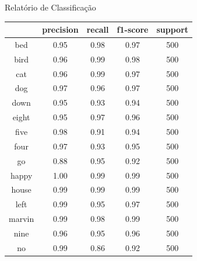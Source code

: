 \documentclass[10pt, compress]{beamer}
\begin{document}
\begin{frame}{Relatório de Classificação}
\begin{table}[htbp]
\centering
\begin{tabular}{|c|c|c|c|c|}
\hline
             & precision  &  recall & f1-score &  support \\ \hline

         bed &      0.95  &    0.98  &    0.97 &      500 \\ \hline
        bird &      0.96  &    0.99  &    0.98 &      500 \\ \hline
         cat &      0.96  &    0.99  &    0.97 &      500 \\ \hline
         dog &      0.97  &    0.96  &    0.97 &      500 \\ \hline
        down &      0.95  &    0.93  &    0.94 &      500 \\ \hline
       eight &      0.95  &    0.97  &    0.96 &      500 \\ \hline
        five &      0.98  &    0.91  &    0.94 &      500 \\ \hline
        four &      0.97  &    0.93  &    0.95 &      500 \\ \hline
          go &      0.88  &    0.95  &    0.92 &      500 \\ \hline
       happy &      1.00  &    0.99  &    0.99 &      500 \\ \hline
       house &      0.99  &    0.99  &    0.99 &      500 \\ \hline
        left &      0.99  &    0.95  &    0.97 &      500 \\ \hline
      marvin &      0.99  &    0.98  &    0.99 &      500 \\ \hline
        nine &      0.96  &    0.95  &    0.96 &      500 \\ \hline
          no &      0.99  &    0.86  &    0.92 &      500 \\ \hline
\end{tabular}
\end{table}
\end{frame}
\end{document}
